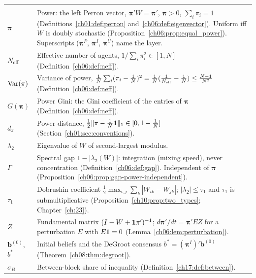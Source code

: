 {\begin{longtable}{@{}>{\raggedright\arraybackslash}p{3.2cm}>{\raggedright\arraybackslash}p{11.3cm}@{}}
\multicolumn{2}{@{}l}{\textit{Power and integration}} \\[2pt]
$\boldsymbol{\pi}$ & Power: the left Perron vector, $\boldsymbol{\pi}'W = \boldsymbol{\pi}'$, $\boldsymbol{\pi} > 0$, $\sum_i\pi_i = 1$ (Definitions~\ref{ch01:def:perron} and~\ref{ch06:def:eigenvector}). Uniform iff $W$ is doubly stochastic (Proposition~\ref{ch06:prop:equal_power}). Superscripts ($\boldsymbol{\pi}^P$, $\boldsymbol{\pi}^I$, $\boldsymbol{\pi}^U$) name the layer. \\
$N_{\text{eff}}$ & Effective number of agents, $1/\sum_i\pi_i^2 \in [1, N]$ (Definition~\ref{ch06:def:neff}). \\
$\operatorname{Var}(\pi)$ & Variance of power, $\frac{1}{N}\sum_i(\pi_i - \frac{1}{N})^2 = \frac{1}{N}(\frac{1}{N_{\text{eff}}} - \frac{1}{N}) \le \frac{N-1}{N^2}$ (Definition~\ref{ch06:def:neff}). \\
$G(\boldsymbol{\pi})$ & Power Gini: the Gini coefficient of the entries of $\boldsymbol{\pi}$ (Definition~\ref{ch06:def:neff}). \\
$d_\pi$ & Power distance, $\frac{1}{2}\|\pi - \frac{1}{N}\mathbf{1}\|_1 \in [0, 1 - \frac{1}{N}]$ (Section~\ref{ch01:sec:conventions}). \\
$\lambda_2$ & Eigenvalue of $W$ of second-largest modulus. \\
$\Gamma$ & Spectral gap $1 - |\lambda_2(W)|$: integration (mixing speed), never concentration (Definition~\ref{ch06:def:gap}). Independent of $\boldsymbol{\pi}$ (Proposition~\ref{ch06:prop:gap-power-independent}). \\
$\tau_1$ & Dobrushin coefficient $\frac{1}{2}\max_{i,j}\sum_k|W_{ik} - W_{jk}|$; $|\lambda_2| \le \tau_1$ and $\tau_1$ is submultiplicative (Proposition~\ref{ch10:prop:two_types}; Chapter~\ref{ch:23}). \\
$Z$ & Fundamental matrix $(I - W + \mathbf{1}\pi')^{-1}$; $d\boldsymbol{\pi}'/dt = \boldsymbol{\pi}'EZ$ for a perturbation $E$ with $E\mathbf{1} = 0$ (Lemma~\ref{ch06:lem:perturbation}). \\
$\mathbf{b}^{(0)}$, $b^*$ & Initial beliefs and the DeGroot consensus $b^* = (\boldsymbol{\pi}^I)'\mathbf{b}^{(0)}$ (Theorem~\ref{ch08:thm:degroot}). \\
$\sigma_B$ & Between-block share of inequality (Definition~\ref{ch17:def:between}). \\[4pt]


\end{longtable}}
